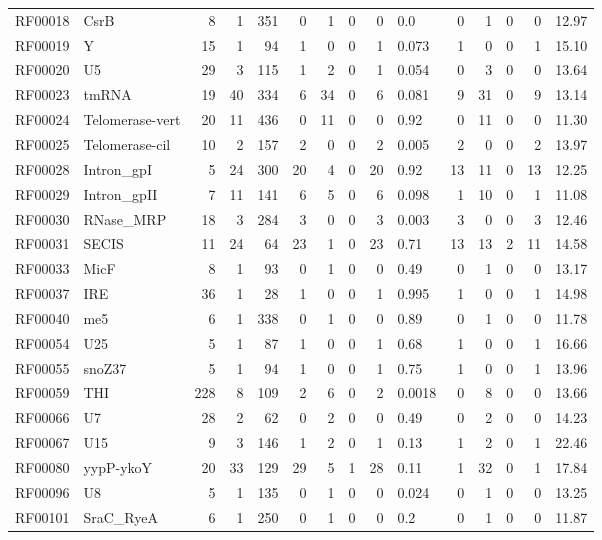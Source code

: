 \begin{table}
\begin{center}
\begin{tabular}{|ll|rrr|rrrrl|rrrrr|}
RF00018 & CsrB & 8 & 1 & 351 & 0 & 1 & 0 & 0 &      0.0 & 0 & 1 & 0 & 0 &  12.97 \\  
RF00019 & Y & 15 & 1 & 94 & 1 & 0 & 0 & 1 &  0.073 & 1 & 0 & 0 & 1 &   15.10 \\  
RF00020 & U5 & 29 & 3 & 115 & 1 & 2 & 0 & 1 &  0.054 & 0 & 3 & 0 & 0 &  13.64 \\  
RF00023 & tmRNA & 19 & 40 & 334 & 6 & 34 & 0 & 6 &  0.081 & 9 & 31 & 0 & 9 &  13.14 \\  
RF00024 & Telomerase-vert & 20 & 11 & 436 & 0 & 11 & 0 & 0 &   0.92 & 0 & 11 & 0 & 0 &   11.30 \\  
RF00025 & Telomerase-cil & 10 & 2 & 157 & 2 & 0 & 0 & 2 &  0.005 & 2 & 0 & 0 & 2 &  13.97 \\  
RF00028 & Intron\_gpI & 5 & 24 & 300 & 20 & 4 & 0 & 20 &   0.92 & 13 & 11 & 0 & 13 &  12.25 \\  
RF00029 & Intron\_gpII & 7 & 11 & 141 & 6 & 5 & 0 & 6 &  0.098 & 1 & 10 & 0 & 1 &  11.08 \\  
RF00030 & RNase\_MRP & 18 & 3 & 284 & 3 & 0 & 0 & 3 &  0.003 & 3 & 0 & 0 & 3 &  12.46 \\  
RF00031 & SECIS & 11 & 24 & 64 & 23 & 1 & 0 & 23 &  0.71 & 13 & 13 & 2 & 11 &  14.58 \\  
RF00033 & MicF & 8 & 1 & 93 & 0 & 1 & 0 & 0 &   0.49 & 0 & 1 & 0 & 0 &  13.17 \\  
RF00037 & IRE & 36 & 1 & 28 & 1 & 0 & 0 & 1 &  0.995 & 1 & 0 & 0 & 1 &  14.98 \\  
RF00040 & me5 & 6 & 1 & 338 & 0 & 1 & 0 & 0 &   0.89 & 0 & 1 & 0 & 0 &  11.78 \\  
RF00054 & U25 & 5 & 1 & 87 & 1 & 0 & 0 & 1 &   0.68 & 1 & 0 & 0 & 1 &  16.66 \\  
RF00055 & snoZ37 & 5 & 1 & 94 & 1 & 0 & 0 & 1 &   0.75 & 1 & 0 & 0 & 1 &  13.96 \\  
RF00059 & THI & 228 & 8 & 109 & 2 & 6 & 0 & 2 & 0.0018 & 0 & 8 & 0 & 0 &  13.66 \\  
RF00066 & U7 & 28 & 2 & 62 & 0 & 2 & 0 & 0 &   0.49 & 0 & 2 & 0 & 0 &  14.23 \\  
RF00067 & U15 & 9 & 3 & 146 & 1 & 2 & 0 & 1 &   0.13 & 1 & 2 & 0 & 1 &  22.46 \\  
RF00080 & yypP-ykoY & 20 & 33 & 129 & 29 & 5 & 1 & 28 &   0.11 & 1 & 32 & 0 & 1 &  17.84 \\  
RF00096 & U8 & 5 & 1 & 135 & 0 & 1 & 0 & 0 &  0.024 & 0 & 1 & 0 & 0 &  13.25 \\  
RF00101 & SraC\_RyeA & 6 & 1 & 250 & 0 & 1 & 0 & 0 &    0.2 & 0 & 1 & 0 & 0 &  11.87 \\  

\end{tabular}
\end{center}
\end{table}
